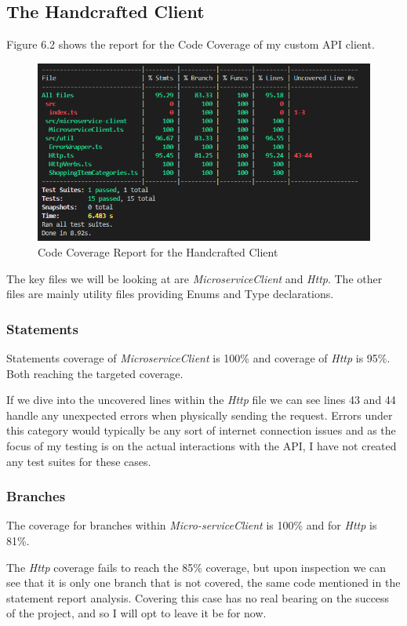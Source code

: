 \subsection{The Handcrafted Client}
Figure 6.2 shows the report for the Code Coverage of my custom API client.
\begin{figure}[!htb]
\caption{Code Coverage Report for the Handcrafted Client}
\centering
\includegraphics[scale=0.70]{FYP_Dissertation_template/Figures/handcrafted-client-code-coverage.PNG}
\end{figure}
\FloatBarrier

The key files we will be looking at are \textit{MicroserviceClient} and \textit{Http}. The other files are mainly utility files providing Enums and Type declarations.
\subsubsection{Statements}
Statements coverage of \textit{MicroserviceClient} is 100\% and coverage of \textit{Http} is 95\%. Both reaching the targeted coverage.

If we dive into the uncovered lines within the \textit{Http} file we can see lines 43 and 44 handle any unexpected errors when physically sending the request. Errors under this category would typically be any sort of internet connection issues and as the focus of my testing is on the actual interactions with the API, I have not created any test suites for these cases.
\subsubsection{Branches}
The coverage for branches within \textit{Micro-serviceClient} is 100\% and for \textit{Http} is 81\%.

The \textit{Http} coverage fails to reach the 85\% coverage, but upon inspection we can see that it is only one branch that is not covered, the same code mentioned in the statement report analysis. Covering this case has no real bearing on the success of the project, and so I will opt to leave it be for now.

